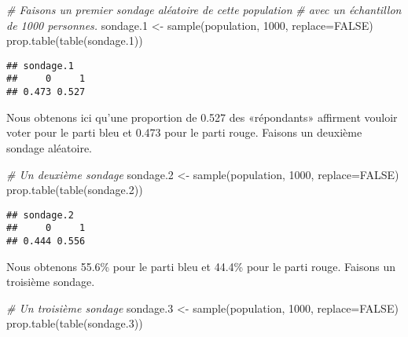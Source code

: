 \documentclass[
]{book}
\newenvironment{Shaded}{\begin{snugshade}}{\end{snugshade}}
\newcommand{\AttributeTok}[1]{\textcolor[rgb]{0.77,0.63,0.00}{#1}}
\newcommand{\CommentTok}[1]{\textcolor[rgb]{0.56,0.35,0.01}{\textit{#1}}}
\newcommand{\ConstantTok}[1]{\textcolor[rgb]{0.00,0.00,0.00}{#1}}
\newcommand{\DecValTok}[1]{\textcolor[rgb]{0.00,0.00,0.81}{#1}}
\newcommand{\FloatTok}[1]{\textcolor[rgb]{0.00,0.00,0.81}{#1}}
\newcommand{\FunctionTok}[1]{\textcolor[rgb]{0.00,0.00,0.00}{#1}}
\newcommand{\NormalTok}[1]{#1}
\newcommand{\OtherTok}[1]{\textcolor[rgb]{0.56,0.35,0.01}{#1}}
\begin{document}
\begin{Shaded}
\begin{Highlighting}[]
\CommentTok{\# Faisons un premier sondage aléatoire de cette population }
\CommentTok{\# avec un échantillon de 1000 personnes.}
\NormalTok{sondage}\FloatTok{.1} \OtherTok{\textless{}{-}} \FunctionTok{sample}\NormalTok{(population, }\DecValTok{1000}\NormalTok{, }\AttributeTok{replace=}\ConstantTok{FALSE}\NormalTok{)}
\FunctionTok{prop.table}\NormalTok{(}\FunctionTok{table}\NormalTok{(sondage}\FloatTok{.1}\NormalTok{))}
\end{Highlighting}
\end{Shaded}

\begin{verbatim}
## sondage.1
##     0     1 
## 0.473 0.527
\end{verbatim}

Nous obtenons ici qu'une proportion de 0.527 des «répondants» affirment vouloir voter pour le parti bleu et 0.473 pour le parti rouge. Faisons un deuxième sondage aléatoire.

\begin{Shaded}
\begin{Highlighting}[]
\CommentTok{\# Un deuxième sondage}
\NormalTok{sondage}\FloatTok{.2} \OtherTok{\textless{}{-}} \FunctionTok{sample}\NormalTok{(population, }\DecValTok{1000}\NormalTok{, }\AttributeTok{replace=}\ConstantTok{FALSE}\NormalTok{)}
\FunctionTok{prop.table}\NormalTok{(}\FunctionTok{table}\NormalTok{(sondage}\FloatTok{.2}\NormalTok{))}
\end{Highlighting}
\end{Shaded}

\begin{verbatim}
## sondage.2
##     0     1 
## 0.444 0.556
\end{verbatim}

Nous obtenons 55.6\% pour le parti bleu et 44.4\% pour le parti rouge. Faisons un troisième sondage.

\begin{Shaded}
\begin{Highlighting}[]
\CommentTok{\# Un troisième sondage}
\NormalTok{sondage}\FloatTok{.3} \OtherTok{\textless{}{-}} \FunctionTok{sample}\NormalTok{(population, }\DecValTok{1000}\NormalTok{, }\AttributeTok{replace=}\ConstantTok{FALSE}\NormalTok{)}
\FunctionTok{prop.table}\NormalTok{(}\FunctionTok{table}\NormalTok{(sondage}\FloatTok{.3}\NormalTok{))}
\end{Highlighting}
\end{Shaded}
\end{document}
